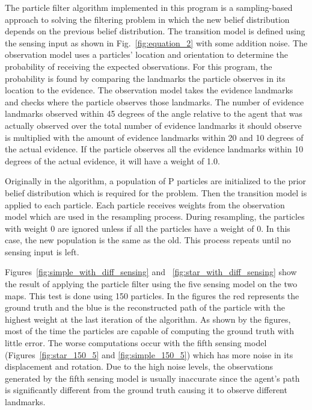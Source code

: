 \documentclass[a4paper,11pt]{report}
\begin{document}
		
	The particle filter algorithm implemented in this program is a sampling-based approach to solving the filtering problem in which the new belief distribution depends on the previous belief distribution. The transition model is defined using the sensing input as shown in Fig.~\ref{fig:equation_2} with some addition noise. The observation model uses a particles' location and orientation to determine the probability of  receiving the expected observations. For this program, the probability is found by comparing the landmarks the particle observes in its location to the evidence. The observation model takes the evidence landmarks and checks where the particle observes those landmarks. The number of evidence landmarks observed within 45 degrees of the angle relative to the agent that was actually observed over the total number of evidence landmarks it should observe is multiplied with the amount of evidence landmarks within 20 and 10 degrees of the actual evidence. If the particle observes all the evidence landmarks within 10 degrees of the actual evidence, it will have a weight of 1.0.
		
	Originally in the algorithm, a population of P particles are initialized to the prior belief distribution which is required for the problem. Then the transition model is applied to each particle. Each particle receives weights from the observation model which are used in the resampling process. During resampling, the particles with weight 0 are ignored unless if all the particles have a weight of 0. In this case, the new population is the same as the old. This process repeats until no sensing input is left.
	
	Figures~\ref{fig:simple_with_diff_sensing} and ~\ref{fig:star_with_diff_sensing} show the result of applying the particle filter using the five sensing model on the two maps. This test is done using 150 particles. In the figures the red represents the ground truth and the blue is the reconstructed path of the particle with the highest weight at the last iteration of the algorithm. As shown by the figures, most of the time the particles are capable of computing the ground truth with little error. The worse computations occur with the fifth sensing model (Figures~\ref{fig:star_150_5} and \ref{fig:simple_150_5}) which has more noise in its displacement and rotation. Due to the high noise levels, the observations generated by the fifth sensing model is usually inaccurate since the agent's path is significantly different from the ground truth causing it to observe different landmarks. 
	
\end{document}
